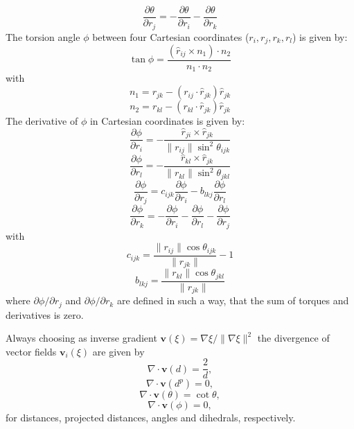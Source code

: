 \begin{equation}
  \frac{\partial \theta}{\partial r_j}= -\frac{\partial \theta}{\partial r_i} - \frac{\partial \theta}{\partial r_k}
\end{equation}
The torsion angle $\phi$ between four Cartesian coordinates ($r_i, r_j, r_k, r_l$) is given by:
\begin{equation}
  \tan \phi = \frac{(\hat{r}_{ij} \times n_1) \cdot n_2}{n_1 \cdot n_2}
\end{equation}
with
\begin{equation}
  n_1 = r_{jk} - (r_{ij} \cdot \hat{r}_{jk})\hat{r}_{jk}
\end{equation}
\begin{equation}
  n_2 = r_{kl} - (r_{kl} \cdot \hat{r}_{jk})\hat{r}_{jk}
\end{equation}
The derivative of $\phi$ in Cartesian coordinates is given by:
\begin{equation}
  \frac{\partial\phi}{\partial r_i} = - \frac{\hat{r}_{ji}\times\hat{r}_{jk}}{\|r_{ij}\|\sin^2\theta_{ijk}}
\end{equation}
\begin{equation}
  \frac{\partial\phi}{\partial r_l} = - \frac{\hat{r}_{kl}\times\hat{r}_{jk}}{\|r_{kl}\|\sin^2\theta_{jkl}}
\end{equation}
\begin{equation}
  \frac{\partial\phi}{\partial r_j} = c_{ijk}\frac{\partial\phi}{\partial r_i} - b_{lkj}\frac{\partial\phi}{\partial r_l}
\end{equation}
\begin{equation}
  \frac{\partial\phi}{\partial r_k} = - \frac{\partial\phi}{\partial r_i} - \frac{\partial\phi}{\partial r_l} - \frac{\partial\phi}{\partial r_j}
\end{equation}
with
\begin{equation}
  c_{ijk} = \frac{\|r_{ij} \| \cos\theta_{ijk}}{\|r_{jk} \|}-1
\end{equation}
\begin{equation}
  b_{lkj} = \frac{\|r_{kl} \| \cos\theta_{jkl}}{\|r_{jk} \|}
\end{equation}
where $\partial \phi/\partial r_j$ and $\partial \phi/\partial r_k$ are defined in such a way, that the sum of torques and derivatives is zero.

Always choosing as inverse gradient $\textbf{v}(\xi) = \nabla \xi/\|\nabla \xi \| ^2$ the divergence of vector fields $\textbf{v}_i(\xi)$ are given by
\begin{equation}
  \nabla \cdot \textbf{v}(d) = \frac{2}{d},
\end{equation}
\begin{equation}
  \nabla \cdot \textbf{v}(d^p) = 0,
\end{equation}
\begin{equation}
  \nabla \cdot \textbf{v}(\theta) = \cot \theta,
\end{equation}
\begin{equation}
  \nabla \cdot \textbf{v}(\phi) = 0,
\end{equation}
for distances, projected distances, angles and dihedrals, respectively.
